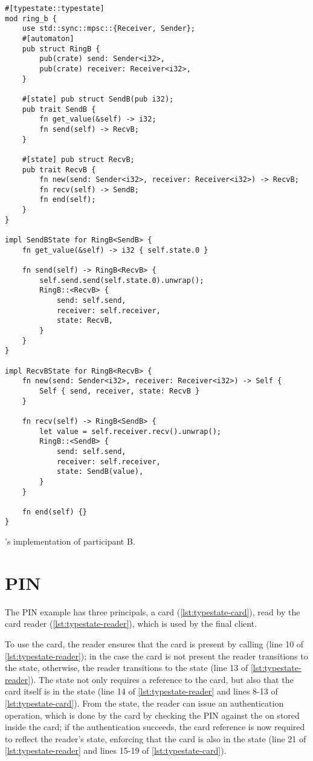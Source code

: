 \begin{listing}
    \begin{verbatim}
#[typestate::typestate]
mod ring_b {
    use std::sync::mpsc::{Receiver, Sender};
    #[automaton]
    pub struct RingB {
        pub(crate) send: Sender<i32>,
        pub(crate) receiver: Receiver<i32>,
    }

    #[state] pub struct SendB(pub i32);
    pub trait SendB {
        fn get_value(&self) -> i32;
        fn send(self) -> RecvB;
    }

    #[state] pub struct RecvB;
    pub trait RecvB {
        fn new(send: Sender<i32>, receiver: Receiver<i32>) -> RecvB;
        fn recv(self) -> SendB;
        fn end(self);
    }
}

impl SendBState for RingB<SendB> {
    fn get_value(&self) -> i32 { self.state.0 }

    fn send(self) -> RingB<RecvB> {
        self.send.send(self.state.0).unwrap();
        RingB::<RecvB> {
            send: self.send,
            receiver: self.receiver,
            state: RecvB,
        }
    }
}

impl RecvBState for RingB<RecvB> {
    fn new(send: Sender<i32>, receiver: Receiver<i32>) -> Self {
        Self { send, receiver, state: RecvB }
    }

    fn recv(self) -> RingB<SendB> {
        let value = self.receiver.recv().unwrap();
        RingB::<SendB> {
            send: self.send,
            receiver: self.receiver,
            state: SendB(value),
        }
    }

    fn end(self) {}
}
    \end{verbatim}
    \caption{'s implementation of participant B.}
    \label{lst:typestate-ring-follower}
\end{listing}


\section{PIN}

The PIN example has three principals, a card (\autoref{lst:typestate-card}),
read by the card reader (\autoref{lst:typestate-reader}),
which is used by the final client.

To use the card, the reader ensures that the card is present by calling 
(line 10 of \autoref{lst:typestate-reader});
in the case the card is not present the reader transitions to the  state,
otherwise, the reader transitions to the  state (line 13 of \autoref{lst:typestate-reader}).
The  state not only requires a reference to the card,
but also that the card itself is in the  state (line 14 of \autoref{lst:typestate-reader}
and lines 8-13 of \autoref{lst:typestate-card}).
From the  state, the reader can issue an authentication operation,
which is done by the card by checking the PIN against the on stored inside the card;
if the authentication succeeds, the card reference is now required to reflect the reader's state,
enforcing that the card is also in the  state
(line 21 of \autoref{lst:typestate-reader} and lines 15-19 of \autoref{lst:typestate-card}).

